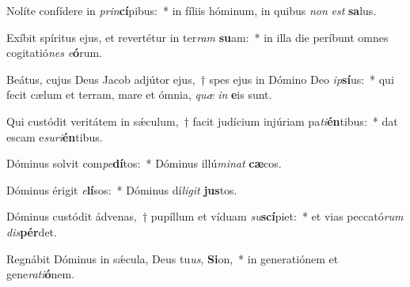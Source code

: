 \item Nolíte confídere in \textit{prin}\textbf{cí}pibus:~* in fíliis hóminum, in quibus \textit{non} \textit{est} \textbf{sa}lus.
\item Exíbit spíritus ejus, et revertétur in ter\textit{ram} \textbf{su}am:~* in illa die períbunt omnes cogitatió\textit{nes} \textit{e}\textbf{ó}rum.
\item Beátus, cujus Deus Jacob adjútor ejus,~† spes ejus in Dómino Deo \textit{ip}\textbf{sí}us:~* qui fecit cælum et terram, mare et ómnia, \textit{quæ} \textit{in} \textbf{e}is sunt.
\item Qui custódit veritátem in sǽculum,~† facit judícium injúriam pa\textit{ti}\textbf{én}tibus:~* dat escam e\textit{su}\textit{ri}\textbf{én}tibus.
\item Dóminus solvit com\textit{pe}\textbf{dí}tos:~* Dóminus illú\textit{mi}\textit{nat} \textbf{cæ}cos.
\item Dóminus érigit \textit{e}\textbf{lí}sos:~* Dóminus dí\textit{li}\textit{git} \textbf{jus}tos.
\item Dóminus custódit ádvenas,~† pupíllum et víduam \textit{su}\textbf{scí}piet:~* et vias peccató\textit{rum} \textit{dis}\textbf{pér}det.
\item Regnábit Dóminus in sǽcula, Deus tu\textit{us}, \textbf{Si}on,~* in generatiónem et gene\textit{ra}\textit{ti}\textbf{ó}nem.
